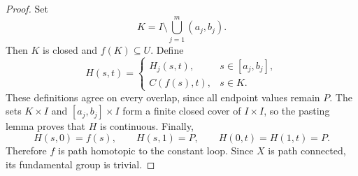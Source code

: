 \documentclass[12pt,a4paper]{article}
\begin{document}
\begin{proof}
        Set
        \[
            K=I\setminus\bigcup_{j=1}^m(a_j,b_j).
        \]
        Then $K$ is closed and $f(K)\subseteq U$. Define
        \[
            H(s,t)=
            \begin{cases}
                H_j(s,t), & s\in[a_j,b_j],\\
                C(f(s),t), & s\in K.
            \end{cases}
        \]
        These definitions agree on every overlap, since all
        endpoint values remain $P$. The sets
        $K\times I$ and $[a_j,b_j]\times I$ form a finite closed
        cover of $I\times I$, so the pasting lemma proves that
        $H$ is continuous. Finally,
        \[
            H(s,0)=f(s),\qquad H(s,1)=P,\qquad
            H(0,t)=H(1,t)=P.
        \]
        Therefore $f$ is path homotopic to the constant loop.
        Since $X$ is path connected, its fundamental group is trivial.
    \end{proof}    
\end{document}
